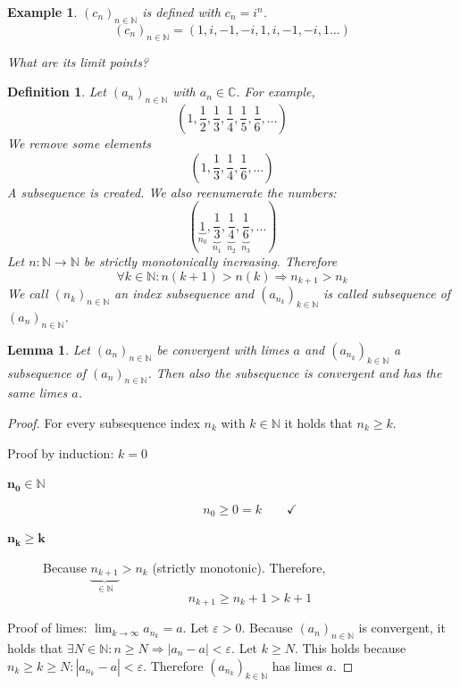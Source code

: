 \documentclass[a4paper,landscape,twocolumn]{article}
\newtheorem{defi}{Definition}
\newtheorem{ex}{Example}
\newtheorem{lemma}{Lemma}
\newcommand\abs[1]{\left|#1\right|}
\newcommand\seq[1]{{\left(#1\right)}_{n \in \mathbb N}}
\begin{document}
\begin{ex}
  $\seq{c_n}$ is defined with $c_n = i^n$.
  \[ \seq{c_n} = (1, i, -1, -i, 1, i, -1, -i, 1 \dots) \]

  What are its limit points?
\end{ex}

\begin{defi}
  Let $\seq{a_n}$ with $a_n \in \mathbb C$. For example,
  \[ (1, \frac12, \frac13, \frac14, \frac15, \frac16, \dots) \]
  We remove some elements
  \[ (1, \frac13, \frac14, \frac16, \dots) \]
  A \emph{subsequence} is created.
  We also reenumerate the numbers:
  \[ (\underbrace{1}_{n_0}, \underbrace{\frac13}_{n_1}, \underbrace{\frac14}_{n_2}, \underbrace{\frac16}_{n_3}, \dots) \]
  Let $n: \mathbb N \to \mathbb N$ be strictly monotonically increasing.
  Therefore
  \[ \forall k \in \mathbb N: n (k+1) > n(k) \Rightarrow n_{k+1} > n_k \]
  We call $\seq{n_k}$ an \emph{index subsequence} and $\left(a_{n_k}\right)_{k \in \mathbb N}$ is called subsequence of $\seq{a_n}$.
\end{defi}

\begin{lemma}
  Let $\seq{a_n}$ be convergent with limes $a$ and $\left(a_{n_k}\right)_{k \in \mathbb N}$ a subsequence of $\seq{a_n}$.
  Then also the subsequence is convergent and has the same limes $a$.
\end{lemma}
\begin{proof}
  For every subsequence index $n_k$ with $k \in \mathbb N$ it holds that $n_k \geq k$.

  Proof by induction: $k=0$
  \begin{description}
    \item[$\mathbf{n_0 \in \mathbb N}$] \[ n_0 \geq 0 = k \qquad\checkmark \]
    \item[$\mathbf{n_k \geq k}$]
      Because $\underbrace{n_{k+1}}_{\in \mathbb N} > n_k$ (strictly monotonic).
      Therefore,
      \[ n_{k+1} \geq n_k + 1 > k + 1 \]
  \end{description}

  Proof of limes: $\lim_{k\to\infty} a_{n_k} = a$.
  Let $\varepsilon > 0$. Because $\seq{a_n}$ is convergent, it holds that
  $\exists N \in \mathbb N: n \geq N \Rightarrow \abs{a_n - a} < \varepsilon$.
  Let $k \geq N$. This holds because $n_k \geq k \geq N: \abs{a_{n_k} - a} < \varepsilon$.
  Therefore $\left(a_{n_k}\right)_{k \in \mathbb N}$ has limes $a$.
\end{proof}
\end{document}
